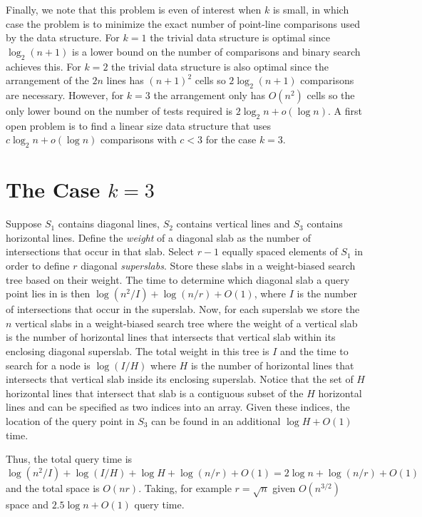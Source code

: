 \documentclass{article}
\begin{document}
Finally, we note that this problem is even of interest when $k$ is
small, in which case the problem is to minimize the exact number of
point-line comparisons used by the data structure.  For $k=1$ the
trivial data structure is optimal since $\log_2 (n+1)$ is a lower
bound on the number of comparisons and binary search achieves this.
For $k=2$ the trivial data structure is also optimal since the
arrangement of the $2n$ lines has $(n+1)^2$ cells so $2\log_2 (n+1)$
comparisons are necessary.  However, for $k=3$ the arrangement only
has $O(n^2)$ cells so the only lower bound on the number of tests
required is $2\log_2 n + o(\log n)$.  A first open problem is to find
a linear size data structure that uses $c\log_2 n + o(\log n)$
comparisons with $c<3$ for the case $k=3$. 

\section{The Case $k=3$}

Suppose $S_1$ contains diagonal lines, $S_2$ contains vertical lines
and $S_3$ contains horizontal lines. Define the \emph{weight} of a
diagonal slab as the number of intersections that occur in that slab.
Select $r-1$ equally spaced elements of $S_1$ in order to define $r$
diagonal \emph{superslabs}.  Store these slabs in a weight-biased
search tree based on their weight.  The time to determine which
diagonal slab a query point lies in is then $\log (n^2/I) + \log (n/r)
+ O(1)$, where $I$ is the number of intersections that occur in the
superslab.  Now, for each superslab we store the $n$ vertical slabs in
a weight-biased search tree where the weight of a vertical slab is the
number of horizontal lines that intersects that vertical slab within
its enclosing diagonal superslab.  The total weight in this tree is $I$ and the
time to search for a node is $\log (I/H)$ where $H$ is the number of
horizontal lines that intersects that vertical slab inside its
enclosing superslab. Notice that the set of $H$ horizontal lines that
intersect that slab is a contiguous subset of the $H$ horizontal lines
and can be specified as two indices into an array.  Given these
indices, the location of the query point in $S_3$ can be found in an
additional $\log H + O(1)$ time.

Thus, the total query time is $\log (n^2/I) + \log(I/H) + \log H +
\log (n/r)+O(1)= 2\log n+\log(n/r)+O(1)$ and the total space is
$O(nr)$.  Taking, for example $r=\sqrt{n}$ given $O(n^{3/2})$ space
and $2.5\log n + O(1)$ query time.
\end{document}
